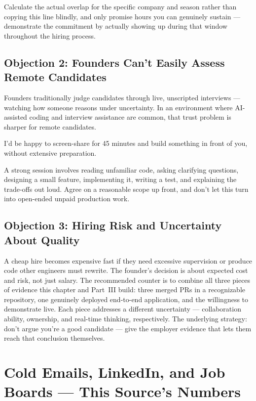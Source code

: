 Calculate the actual overlap for the specific company and season rather than copying this line blindly, and only
promise hours you can genuinely sustain — demonstrate the commitment by actually showing up during that window
throughout the hiring process.

\subsection{Objection 2: Founders Can't Easily Assess Remote Candidates}

Founders traditionally judge candidates through live, unscripted interviews — watching how someone reasons under
uncertainty. In an environment where AI-assisted coding and interview assistance are common, that trust problem
is sharper for remote candidates.

\begin{template}
I'd be happy to screen-share for 45 minutes and build something in front of you, without extensive preparation.
\end{template}

A strong session involves reading unfamiliar code, asking clarifying questions, designing a small feature,
implementing it, writing a test, and explaining the trade-offs out loud. Agree on a reasonable scope up front,
and don't let this turn into open-ended unpaid production work.

\subsection{Objection 3: Hiring Risk and Uncertainty About Quality}

A cheap hire becomes expensive fast if they need excessive supervision or produce code other engineers must
rewrite. The founder's decision is about expected cost and risk, not just salary. The recommended counter is to
combine all three pieces of evidence this chapter and Part~III build: three merged PRs in a recognizable
repository, one genuinely deployed end-to-end application, and the willingness to demonstrate live. Each piece
addresses a different uncertainty — collaboration ability, ownership, and real-time thinking, respectively. The
underlying strategy: don't argue you're a good candidate — give the employer evidence that lets them reach that
conclusion themselves.

\section{Cold Emails, LinkedIn, and Job Boards — This Source's Numbers}

